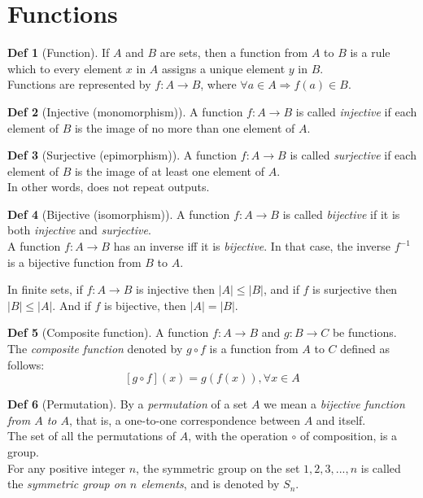 \documentclass{article}
\theoremstyle{definition}
\newtheorem{definition}{Def}[section]
\begin{document}
\section{Functions}
\begin{definition}[Function]
    If $A$ and $B$ are sets, then a function from $A$ to $B$ is a rule which to every element $x$ in $A$ assigns a unique element $y$ in $B$.
    \\
    Functions are represented by $f: A \rightarrow B$, where $\forall a \in A \Rightarrow f(a) \in B$.
\end{definition}

\begin{definition}[Injective (monomorphism)]
    A function $f:A \rightarrow B$ is called \emph{injective} if each element of $B$ is the image of no more than one element of $A$.
\end{definition}

\begin{definition}[Surjective (epimorphism)]
    A function $f:A \rightarrow B$ is called \emph{surjective} if each element of $B$ is the image of at least one element of $A$.
    \\ In other words, does not repeat outputs.
\end{definition}

\begin{definition}[Bijective (isomorphism)]
    A function $f:A \rightarrow B$ is called \emph{bijective} if it is both \emph{injective} and \emph{surjective}.
    \\
    A function $f: A \rightarrow B$ has an inverse iff it is \emph{bijective}. In that case, the inverse $f^{-1}$ is a bijective function from $B$ to $A$.
\end{definition}

In finite sets, if $f: A \rightarrow B$ is injective then $|A| \leq |B|$, and if $f$ is surjective then $|B| \leq |A|$. And if $f$ is bijective, then $|A| = |B|$.

\begin{definition}[Composite function]
    A function $f:A \rightarrow B$ and $g: B \rightarrow C$ be functions. The \emph{composite function} denoted by $g \circ f$ is a function from $A$ to $C$ defined as follows:
    $$[g \circ f](x) = g(f(x)),  \forall x \in A$$
\end{definition}


\begin{definition}[Permutation]
    By a \emph{permutation} of a set $A$ we mean a \emph{bijective function from $A$ to $A$}, that is, a one-to-one correspondence between $A$ and itself.
    \\
    The set of all the permutations of $A$, with the operation $\circ$ of composition, is a group.
    \\
    For any positive integer $n$, the symmetric group on the set ${1,2, 3,..., n}$ is called the \emph{symmetric group on $n$ elements}, and is denoted by $S_n$.
\end{definition}
\end{document}
